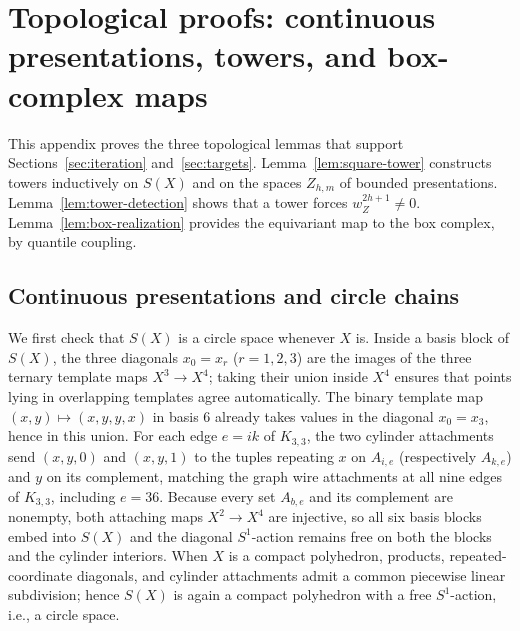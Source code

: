 \section{Topological proofs: continuous presentations, towers, and box-complex maps}\label{app:topology}

This appendix proves the three topological lemmas that support Sections~\ref{sec:iteration} and~\ref{sec:targets}. Lemma~\ref{lem:square-tower} constructs towers inductively on $S(X)$ and on the spaces $Z_{h,m}$ of bounded presentations. Lemma~\ref{lem:tower-detection} shows that a tower forces $w_Z^{2h+1}\ne0$. Lemma~\ref{lem:box-realization} provides the equivariant map to the box complex, by quantile coupling.

\subsection{Continuous presentations and circle chains}\label{app:cont-pres}

We first check that $S(X)$ is a circle space whenever $X$ is. Inside a basis block of $S(X)$, the three diagonals $x_0=x_r$ ($r=1,2,3$) are the images of the three ternary template maps $X^3\to X^4$; taking their union inside $X^4$ ensures that points lying in overlapping templates agree automatically. The binary template map $(x,y)\mapsto(x,y,y,x)$ in basis $6$ already takes values in the diagonal $x_0=x_3$, hence in this union. For each edge $e=ik$ of $K_{3,3}$, the two cylinder attachments send $(x,y,0)$ and $(x,y,1)$ to the tuples repeating $x$ on $A_{i,e}$ (respectively $A_{k,e}$) and $y$ on its complement, matching the graph wire attachments at all nine edges of $K_{3,3}$, including $e=36$. Because every set $A_{b,e}$ and its complement are nonempty, both attaching maps $X^2\to X^4$ are injective, so all six basis blocks embed into $S(X)$ and the diagonal $S^1$-action remains free on both the blocks and the cylinder interiors. When $X$ is a compact polyhedron, products, repeated-coordinate diagonals, and cylinder attachments admit a common piecewise linear subdivision; hence $S(X)$ is again a compact polyhedron with a free $S^1$-action, i.e., a circle space.

